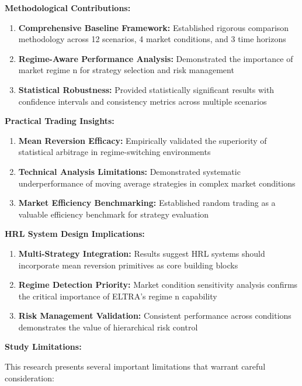 \documentclass[11pt]{article}
\begin{document}
\textbf{Methodological Contributions:}
\begin{enumerate}
\item \textbf{Comprehensive Baseline Framework:} Established rigorous comparison methodology across 12 scenarios, 4 market conditions, and 3 time horizons
\item \textbf{Regime-Aware Performance Analysis:} Demonstrated the importance of market regime n for strategy selection and risk management
\item \textbf{Statistical Robustness:} Provided statistically significant results with confidence intervals and consistency metrics across multiple scenarios

\end{enumerate}
\textbf{Practical Trading Insights:}
\begin{enumerate}
\item \textbf{Mean Reversion Efficacy:} Empirically validated the superiority of statistical arbitrage in regime-switching environments
\item \textbf{Technical Analysis Limitations:} Demonstrated systematic underperformance of moving average strategies in complex market conditions
\item \textbf{Market Efficiency Benchmarking:} Established random trading as a valuable efficiency benchmark for strategy evaluation

\end{enumerate}
\textbf{HRL System Design Implications:}
\begin{enumerate}
\item \textbf{Multi-Strategy Integration:} Results suggest HRL systems should incorporate mean reversion primitives as core building blocks
\item \textbf{Regime Detection Priority:} Market condition sensitivity analysis confirms the critical importance of ELTRA's regime n capability
\item \textbf{Risk Management Validation:} Consistent performance across conditions demonstrates the value of hierarchical risk control

\end{enumerate}
\textbf{Study Limitations:}

This research presents several important limitations that warrant careful consideration:
\end{document}
